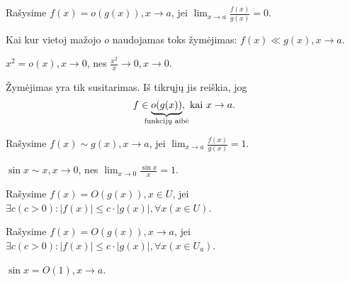 \begin{defn}
  Rašysime $f(x) = o(g(x)), x \to a$, jei 
  $\lim_{x \to a} \frac{f(x)}{g(x)} = 0$.
\end{defn}

\begin{notation}
  Kai kur vietoj mažojo $o$ naudojamas toks žymėjimas: 
  $f(x) \ll g(x), x \to a$.
\end{notation}

\begin{exmp}
  $x^2 = o(x), x \to 0$, nes $\frac{x^2}{x} \to 0, x \to 0$.
\end{exmp}

\begin{note}
  Žymėjimas yra tik susitarimas. Iš tikrųjų jis reiškia, jog
  \begin{equation*}
    f \in \underbrace{o(g(x))}_{\mathclap{\text{funkcijų aibė}}}, 
      \text{ kai } x \to a.
  \end{equation*}
\end{note}

\begin{defn}
  Rašysime $f(x) \sim g(x), x \to a$, jei 
  $\lim_{x \to a} \frac{f(x)}{g(x)} = 1$.
\end{defn}

\begin{exmp}
  $\sin x \sim x, x \to 0$, nes $\lim_{x \to 0} \frac{\sin x}{x} = 1$.
\end{exmp}

\begin{defn}
  Rašysime $f(x) = O(g(x)), x \in U$, jei 
  $\exists c (c > 0) : |f(x)| \leq c \cdot |g(x)|, \forall x (x \in U)$.
\end{defn}

\begin{defn}
  Rašysime $f(x) = O(g(x)), x \to a$, jei
  $\exists c (c > 0): |f(x)| \leq c \cdot |g(x)|, \forall x (x \in U_{a})$.
\end{defn}

\begin{exmp}
  $\sin x = O(1), x \to a$.
\end{exmp}
